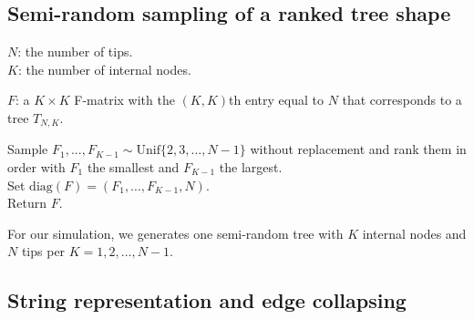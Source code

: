 \documentclass{article}
\begin{document}
\subsection{Semi-random sampling of a ranked tree shape} \label{sec:semi-random}

\begin{algorithm}[H] 
\caption{Semi-random sampling of a tree with $N$ tips and $K$ internal nodes}
\label{alg:semi_random_sampling}
\vspace{0.1in}
\KwData{}
$N$: the number of tips. \\
$K$: the number of internal nodes.
    
\vspace{0.1in}

\KwResult{}
$F$: a $K \times K$ F-matrix with the $(K,K)$th entry equal to $N$ that corresponds to a tree $T_{N,K}$. 

\vspace{0.1in}

Sample $F_1,..., F_{K-1} \sim \text{Unif}\{2,3,...,N-1\}$ without replacement and rank them in order with $F_1$ the smallest and $F_{K-1}$ the largest. \\
Set $\text{diag}(F)= (F_1,..., F_{K-1}, N)$. \\
Return $F$. \\
\vspace{0.1in}
\end{algorithm}

\vspace{0.1in}
For our simulation, we generates one semi-random tree with $K$ internal nodes and $N$ tips per $K=1,2,\ldots,N-1$. 

\subsection{String representation and edge collapsing} \label{sec:string-collapse}
\end{document}
